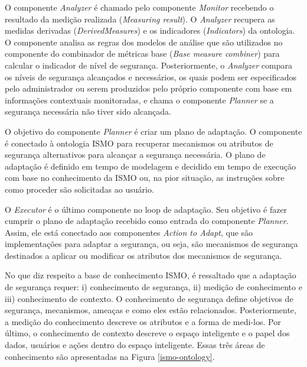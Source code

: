 \documentclass[tid,table]{texufpel} %
\begin{document}
O componente \textit{Analyzer} é chamado pelo componente \textit{Monitor} recebendo o resultado da medição realizada (\textit{Measuring result}). %
O \textit{Analyzer} recupera as medidas derivadas (\textit{DerivedMeasures}) e os indicadores (\textit{Indicators}) da ontologia. O componente analisa as regras dos modelos de análise que são utilizados no componente do combinador de métricas base (\textit{Base measure combiner}) para calcular o indicador de nível de segurança. Posteriormente, o \textit{Analyzer} compara os níveis de segurança alcançados e necessários, os quais podem ser especificados pelo administrador ou serem produzidos pelo próprio componente com base em informações contextuais monitoradas, e chama o componente \textit{Planner} se a segurança necessária não tiver sido alcançada. 



O objetivo do componente \textit{Planner} é criar um plano de adaptação. O componente é conectado à ontologia ISMO para recuperar mecanismos ou atributos de segurança alternativos para alcançar a segurança necessária. O plano de adaptação é definido em tempo de modelagem e decidido em tempo de execução com base no conhecimento da ISMO ou, na pior situação, as instruções sobre como proceder são solicitadas ao usuário.

O \textit{Executor} é o último componente no loop de adaptação. Seu objetivo é fazer cumprir o plano de adaptação recebido como entrada do componente \textit{Planner}. Assim, ele está conectado aos componentes \textit{Action to Adapt}, que são implementações para adaptar a segurança, ou seja, são mecanismos de segurança destinados a aplicar ou modificar os atributos dos mecanismos de segurança.

No que diz respeito a base de conhecimento ISMO, é ressaltado que a adaptação de segurança requer: i) conhecimento de segurança, ii) medição de conhecimento e iii) conhecimento de contexto. O conhecimento de segurança define objetivos de segurança, mecanismos, ameaças e como eles estão relacionados. Posteriormente, a medição do conhecimento descreve os atributos e a forma de medi-los. Por último, o conhecimento de contexto descreve o espaço inteligente e o papel dos dados, usuários e ações dentro do espaço inteligente. Essas três áreas de conhecimento são apresentadas na Figura \ref{ismo-ontology}.
\end{document}
